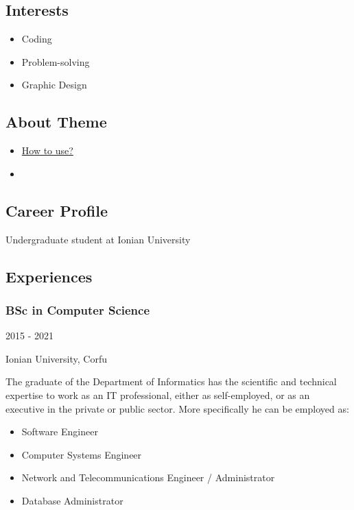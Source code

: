 \documentclass[]{article}
\providecommand{\tightlist}{%
  \setlength{\itemsep}{0pt}\setlength{\parskip}{0pt}}
\begin{document}
\subsection{Interests}\label{interests}

\begin{itemize}
\tightlist
\item
  Coding
\item
  Problem-solving
\item
  Graphic Design
\end{itemize}

\subsection{About Theme}\label{about-theme}

\begin{itemize}
\tightlist
\item
  \href{https://www.youtube.com/watch?v=Jnmj1dXDbNk}{How to use?}
\item
  {}
\end{itemize}

\subsection{\texorpdfstring{{ \emph{} \emph{} } Career
Profile}{    Career Profile}}\label{career-profile}

Undergraduate student at Ionian University

\subsection{\texorpdfstring{{ \emph{} \emph{} }
Experiences}{    Experiences}}\label{experiences}

\subsubsection{BSc in Computer Science}\label{bsc-in-computer-science-1}

2015 - 2021

Ionian University, Corfu

The graduate of the Department of Informatics has the scientific and
technical expertise to work as an IT professional, either as
self-employed, or as an executive in the private or public sector. More
specifically he can be employed as:

\begin{itemize}
\tightlist
\item
  Software Engineer
\item
  Computer Systems Engineer
\item
  Network and Telecommunications Engineer / Administrator
\item
  Database Administrator
\end{itemize}
\end{document}
